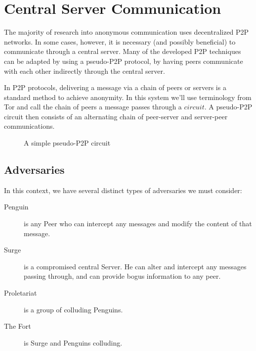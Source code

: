 \documentclass[twocolumn,11pt,english]{paper}
\begin{document}
\section{Central Server Communication}
The majority of research into anonymous communication uses decentralized P2P networks. In some cases, however, it is necessary (and possibly beneficial) to communicate through a central server. Many of the developed P2P techniques can be adapted by using a pseudo-P2P protocol, by having peers communicate with each other indirectly through the central server. 

In P2P protocols, delivering a message via a chain of peers or servers is a standard method to achieve anonymity. In this system we'll use terminology from Tor and call the chain of peers a message passes through a $circuit$. A pseudo-P2P circuit then consists of an alternating chain of peer-server and server-peer communications.

\begin{figure}[ht]
  \begin{center}
  \end{center}
  \caption{A simple pseudo-P2P circuit}
\end{figure}

\subsection{Adversaries}
In this context, we have several distinct types of adversaries we must consider:
\begin{description}
\item[Penguin] 
  is any Peer who can intercept any messages and modify the content of that message.
\item[Surge] 
  is a compromised central Server. He can alter and intercept any messages passing through, and can provide bogus information to any peer.
\item[Proletariat] 
  is a group of colluding Penguins.
\item[The Fort] 
  is Surge and Penguins colluding. 
\end{description}
\end{document}
